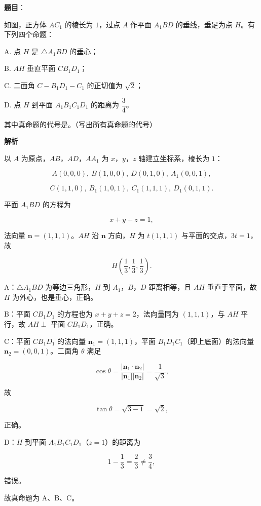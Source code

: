 \begin{answer}

\textbf{题目}：

如图，正方体 $AC_1$ 的棱长为 $1$，过点 $A$ 作平面 $A_1BD$ 的垂线，垂足为点 $H$。有下列四个命题：

A. 点 $H$ 是 $\triangle A_1BD$ 的垂心；

B. $AH$ 垂直平面 $CB_1D_1$；

C. 二面角 $C-B_1D_1-C_1$ 的正切值为 $\sqrt2$；

D. 点 $H$ 到平面 $A_1B_1C_1D_1$ 的距离为 $\dfrac34$。

其中真命题的代号是\gkblank{}。（写出所有真命题的代号）
\nopagebreak[4]
\begin{center}\end{center}
\nopagebreak[4]
\textbf{解析}

以 $A$ 为原点，$AB$，$AD$，$AA_1$ 为 $x$，$y$，$z$ 轴建立坐标系，棱长为 $1$：

\nopagebreak[4]
\[A(0,0,0),\ B(1,0,0),\ D(0,1,0),\ A_1(0,0,1),\]

\nopagebreak[4]
\[C(1,1,0),\ B_1(1,0,1),\ C_1(1,1,1),\ D_1(0,1,1).\]

平面 $A_1BD$ 的方程为

\nopagebreak[4]
\[x+y+z=1,\]

法向量 $\boldsymbol n=(1,1,1)$。$AH$ 沿 $\boldsymbol n$ 方向，$H$ 为 $t(1,1,1)$ 与平面的交点，$3t=1$，故

\nopagebreak[4]
\[H\left(\frac13,\frac13,\frac13\right).\]

A：$\triangle A_1BD$ 为等边三角形，$H$ 到 $A_1$，$B$，$D$ 距离相等，且 $AH$ 垂直于平面，故 $H$ 为外心，也是垂心，正确。

B：平面 $CB_1D_1$ 的方程也为 $x+y+z=2$，法向量同为 $(1,1,1)$，与 $AH$ 平行，故 $AH\perp$ 平面 $CB_1D_1$，正确。

C：平面 $CB_1D_1$ 的法向量 $\boldsymbol n_1=(1,1,1)$，平面 $B_1D_1C_1$（即上底面）的法向量 $\boldsymbol n_2=(0,0,1)$。二面角 $\theta$ 满足

\nopagebreak[4]
\[\cos\theta=\frac{|\boldsymbol n_1\cdot\boldsymbol n_2|}{|\boldsymbol n_1||\boldsymbol n_2|}=\frac1{\sqrt3},\]

故

\nopagebreak[4]
\[\tan\theta=\sqrt{3-1}=\sqrt2,\]

正确。

D：$H$ 到平面 $A_1B_1C_1D_1$（$z=1$）的距离为

\nopagebreak[4]
\[1-\frac13=\frac23\neq\frac34,\]

错误。

故真命题为 A、B、C。


\end{answer}
